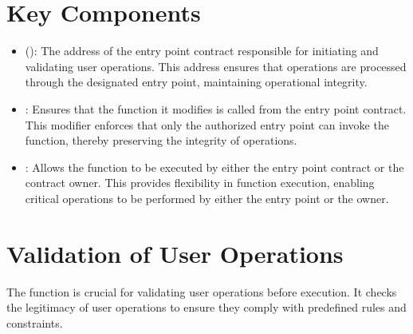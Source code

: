 \documentclass[letterpaper,10pt,english]{sphinxmanual}
\begin{document}
\section{Key Components}
\label{\detokenize{docs_minimal_account_abstraction:key-components}}
\sphinxAtStartPar
{}
\begin{itemize}
\item {} 
\sphinxAtStartPar
{} ():
The address of the entry point contract responsible for initiating and validating user operations. This address ensures that operations are processed through the designated entry point, maintaining operational integrity.

\end{itemize}

\sphinxAtStartPar
{}
\begin{itemize}
\item {} 
\sphinxAtStartPar
{}:
Ensures that the function it modifies is called from the entry point contract. This modifier enforces that only the authorized entry point can invoke the function, thereby preserving the integrity of operations.

\item {} 
\sphinxAtStartPar
{}:
Allows the function to be executed by either the entry point contract or the contract owner. This provides flexibility in function execution, enabling critical operations to be performed by either the entry point or the owner.

\end{itemize}

\sphinxAtStartPar
{}


\section{Validation of User Operations}
\label{\detokenize{docs_minimal_account_abstraction:validation-of-user-operations}}
\sphinxAtStartPar
The  function is crucial for validating user operations before execution. It checks the legitimacy of user operations to ensure they comply with predefined rules and constraints.

\sphinxAtStartPar
{}
\end{document}
